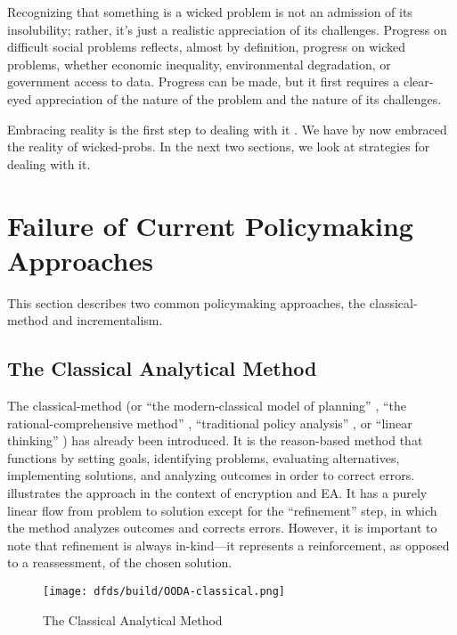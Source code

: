 \begin{displayquote}
Recognizing that something is a wicked problem is not an admission of its insolubility; rather, it’s just a realistic
appreciation of its challenges. Progress on difficult social problems reflects, almost by definition, progress on wicked
problems, whether economic inequality, environmental degradation, or government access to data. Progress can be made,
but it first requires a clear-eyed appreciation of the nature of the problem and the nature of its challenges.
\cite{rozenshtein_wicked_2018}
\end{displayquote}

Embracing reality is the first step to dealing with it \cite{baker_2019}. We have by now embraced the reality of
\acp{wicked-prob}. In the next two sections, we look at strategies for dealing with it.


\section{Failure of Current Policymaking Approaches}

This section describes two common policymaking approaches, the \ac{classical-method} and \ac{incrementalism}.

\subsection{The Classical Analytical Method}

The \ac{classical-method} \cite{feeley_judicial_2000} (or ``the modern-classical model of planning''
\cite{rittel_dilemmas_1973}, ``the rational-comprehensive method'' \cite{lindblom_muddling_1959}, ``traditional policy
analysis'' \cite{rozenshtein_wicked_2018}, or ``linear thinking'' \cite{commission_tackling_2018}) has already been
introduced. It is the reason-based method that functions by setting goals, identifying problems, evaluating
alternatives, implementing solutions, and analyzing outcomes in order to correct errors. 
illustrates the approach in the context of encryption and \ac{EA}. It has a purely linear flow from problem to solution
except for the ``refinement'' step, in which the method analyzes outcomes and corrects errors. However, it is important
to note that refinement is always in-kind---it represents a reinforcement, as opposed to a reassessment, of the chosen
solution.

\begin{figure}[h]
  \centering\CaptionFontSize
  \texttt{[image: dfds/build/OODA-classical.png]}
  \caption[The Classical Analytical Method]{The Classical Analytical Method}
  \label{fig-classical-method}
\end{figure}

